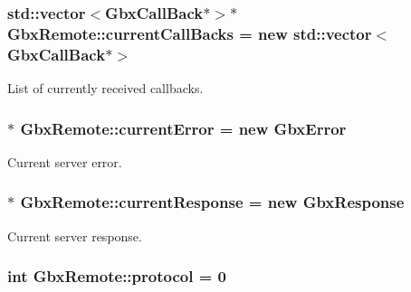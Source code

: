 \hypertarget{classGbxRemote_a41ed9a6bb1655774d66c9c78b896cda9}{
\subsubsection[{current\-Call\-Backs}]{\setlength{\rightskip}{0pt plus 5cm}std\-::vector$<${\bf Gbx\-Call\-Back}$\ast$$>$$\ast$ Gbx\-Remote\-::current\-Call\-Backs = new std\-::vector$<${\bf Gbx\-Call\-Back}$\ast$$>$\hspace{0.3cm}{\ttfamily [private]}}}\label{classGbxRemote_a41ed9a6bb1655774d66c9c78b896cda9}


List of currently received callbacks. 

\hypertarget{classGbxRemote_ae5d44c3729140c1eba5e850cb5e5e7bd}{
\subsubsection[{current\-Error}]{$\ast$ Gbx\-Remote\-::current\-Error = new {\bf Gbx\-Error}\hspace{0.3cm}{\ttfamily [private]}}}\label{classGbxRemote_ae5d44c3729140c1eba5e850cb5e5e7bd}


Current server error. 

\hypertarget{classGbxRemote_a3a3a0af1a692a801a33baa292b877dc2}{
\subsubsection[{current\-Response}]{$\ast$ Gbx\-Remote\-::current\-Response = new {\bf Gbx\-Response}\hspace{0.3cm}{\ttfamily [private]}}}\label{classGbxRemote_a3a3a0af1a692a801a33baa292b877dc2}


Current server response. 

\hypertarget{classGbxRemote_a5ee5c7087085cb6cb2e7bc6135ff0646}{
\subsubsection[{protocol}]{\setlength{\rightskip}{0pt plus 5cm}int Gbx\-Remote\-::protocol = 0\hspace{0.3cm}{\ttfamily [private]}}}\label{classGbxRemote_a5ee5c7087085cb6cb2e7bc6135ff0646}


